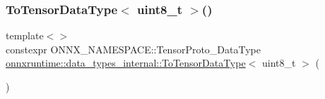 \subsubsection{\texorpdfstring{To\+Tensor\+Data\+Type$<$ uint8\+\_\+t $>$()}{ToTensorDataType< uint8\_t >()}}
{\footnotesize\ttfamily template$<$$>$ \\
constexpr O\+N\+N\+X\+\_\+\+N\+A\+M\+E\+S\+P\+A\+C\+E\+::\+Tensor\+Proto\+\_\+\+Data\+Type \mbox{\hyperlink{namespaceonnxruntime_1_1data__types__internal_a083dfe9320ee42949a5284c6989a79d1}{onnxruntime\+::data\+\_\+types\+\_\+internal\+::\+To\+Tensor\+Data\+Type}}$<$ uint8\+\_\+t $>$ (\begin{DoxyParamCaption}{ }\end{DoxyParamCaption})}

